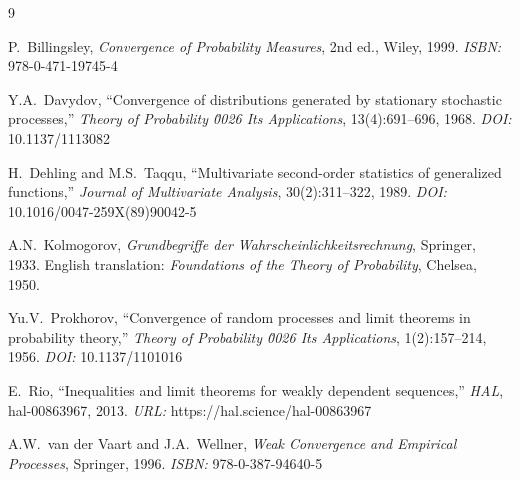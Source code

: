 \documentclass[11pt,a4paper]{amsart}
\theoremstyle{definition}
\begin{document}

\begin{thebibliography}{9}

P.~Billingsley, \textit{Convergence of Probability Measures}, 2nd ed., Wiley, 1999.
\textit{ISBN:} 978-0-471-19745-4

Y.A.~Davydov, ``Convergence of distributions generated by stationary stochastic 
processes,'' \textit{Theory of Probability \u0026 Its Applications}, 13(4):691--696, 1968.
\textit{DOI:} 10.1137/1113082

H.~Dehling and M.S.~Taqqu, ``Multivariate second-order statistics of generalized 
functions,'' \textit{Journal of Multivariate Analysis}, 30(2):311--322, 1989.
\textit{DOI:} 10.1016/0047-259X(89)90042-5

A.N.~Kolmogorov, \textit{Grundbegriffe der Wahrscheinlichkeitsrechnung}, Springer, 1933.
English translation: \textit{Foundations of the Theory of Probability}, Chelsea, 1950.

Yu.V.~Prokhorov, ``Convergence of random processes and limit theorems in probability 
theory,'' \textit{Theory of Probability \u0026 Its Applications}, 1(2):157--214, 1956.
\textit{DOI:} 10.1137/1101016

E.~Rio, ``Inequalities and limit theorems for weakly dependent sequences,'' 
\textit{HAL}, hal-00863967, 2013.
\textit{URL:} https://hal.science/hal-00863967

A.W.~van der Vaart and J.A.~Wellner, \textit{Weak Convergence and Empirical Processes}, 
Springer, 1996. \textit{ISBN:} 978-0-387-94640-5

\end{thebibliography}
\end{document}
